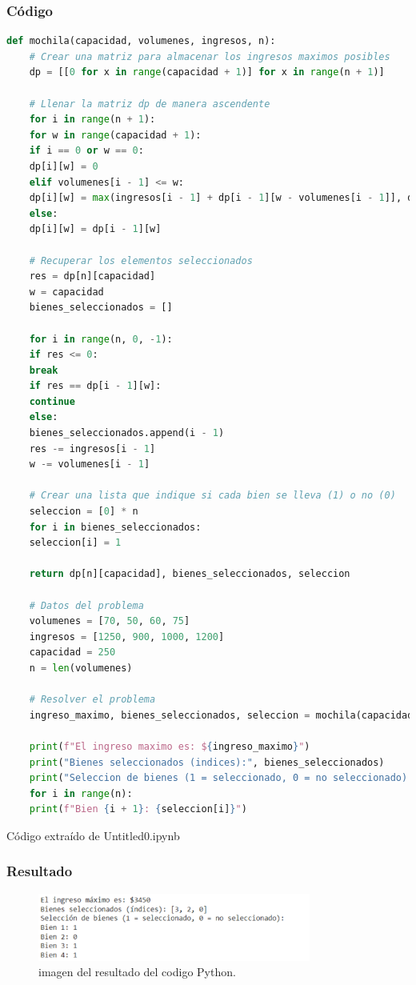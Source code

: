 \subsubsection{Código}
\begin{lstlisting}[language=Python]
	def mochila(capacidad, volumenes, ingresos, n):
	# Crear una matriz para almacenar los ingresos maximos posibles
	dp = [[0 for x in range(capacidad + 1)] for x in range(n + 1)]
	
	# Llenar la matriz dp de manera ascendente
	for i in range(n + 1):
	for w in range(capacidad + 1):
	if i == 0 or w == 0:
	dp[i][w] = 0
	elif volumenes[i - 1] <= w:
	dp[i][w] = max(ingresos[i - 1] + dp[i - 1][w - volumenes[i - 1]], dp[i - 1][w])
	else:
	dp[i][w] = dp[i - 1][w]
	
	# Recuperar los elementos seleccionados
	res = dp[n][capacidad]
	w = capacidad
	bienes_seleccionados = []
	
	for i in range(n, 0, -1):
	if res <= 0:
	break
	if res == dp[i - 1][w]:
	continue
	else:
	bienes_seleccionados.append(i - 1)
	res -= ingresos[i - 1]
	w -= volumenes[i - 1]
	
	# Crear una lista que indique si cada bien se lleva (1) o no (0)
	seleccion = [0] * n
	for i in bienes_seleccionados:
	seleccion[i] = 1
	
	return dp[n][capacidad], bienes_seleccionados, seleccion
	
	# Datos del problema
	volumenes = [70, 50, 60, 75]
	ingresos = [1250, 900, 1000, 1200]
	capacidad = 250
	n = len(volumenes)
	
	# Resolver el problema
	ingreso_maximo, bienes_seleccionados, seleccion = mochila(capacidad, volumenes, ingresos, n)
	
	print(f"El ingreso maximo es: ${ingreso_maximo}")
	print("Bienes seleccionados (indices):", bienes_seleccionados)
	print("Seleccion de bienes (1 = seleccionado, 0 = no seleccionado):")
	for i in range(n):
	print(f"Bien {i + 1}: {seleccion[i]}")
\end{lstlisting}

Código extraído de Untitled0.ipynb


\subsubsection{Resultado}
\begin{figure}[H]
	\centering
	\includegraphics[width=0.8\textwidth]{resultado_mochila_ejem2.png}
	\caption{imagen del resultado del codigo Python.}
	\label{fig:resultado}
\end{figure}

